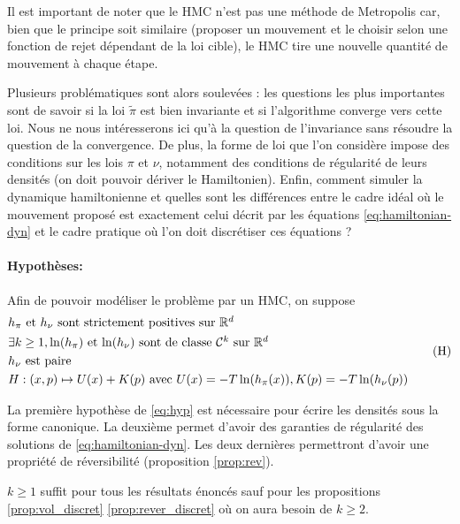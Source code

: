 \documentclass[10pt,a4paper]{article}
\begin{document}
Il est important de noter que le HMC n'est pas une méthode de Metropolis car, bien que le principe soit similaire (proposer un mouvement et le choisir selon une fonction de rejet dépendant de la loi cible), le HMC tire une nouvelle quantité de mouvement à chaque étape.

Plusieurs problématiques sont alors soulevées : les questions les plus importantes sont de savoir si la loi $\widetilde{\pi}$ est bien invariante et si l'algorithme converge vers cette loi. Nous ne nous intéresserons ici qu'à la question de l'invariance sans résoudre la question de la convergence. De plus, la forme de loi que l'on considère impose des conditions sur les lois $\pi$ et $\nu$, notamment des conditions de régularité de leurs densités (on doit pouvoir dériver le Hamiltonien). Enfin, comment simuler la dynamique hamiltonienne et quelles sont les différences entre le cadre idéal où le mouvement proposé est exactement celui décrit par les équations \eqref{eq:hamiltonian-dyn} et le cadre pratique où l'on doit discrétiser ces équations ?

\paragraph{Hypothèses:}
Afin de pouvoir modéliser le problème par un HMC, on suppose
\begin{equation}\label{eq:hyp}
	\begin{aligned}
		&\mbox{$h_\pi$ et $h_\nu$ sont strictement positives sur $\mathbb{R}^d$} \\
		&\mbox{$\exists k \geq 1, \ln(h_\pi)$ et $\ln(h_\nu)$ sont de classe $\mathcal{C}^k$ sur $\mathbb{R}^d$}\\
		&\mbox{$h_\nu$ est paire} \\
                & H : (x,p) \mapsto U(x) + K(p) \text{ avec } U(x) = - T \ln(h_\pi(x)), K(p) = -T \ln(h_\nu(p))
	\end{aligned}
	\tag{H}
\end{equation}

\begin{Rque}
	La première hypothèse de \eqref{eq:hyp} est nécessaire pour écrire les densités sous la forme canonique. La deuxième permet d'avoir des garanties de régularité des solutions de \eqref{eq:hamiltonian-dyn}. Les deux dernières permettront d'avoir une propriété de réversibilité (proposition \ref{prop:rev}).

	$k \geq 1$ suffit pour tous les résultats énoncés sauf pour les propositions \ref{prop:vol_discret} \ref{prop:rever_discret} où on aura besoin de $k \geq 2$.
\end{Rque}
\end{document}
